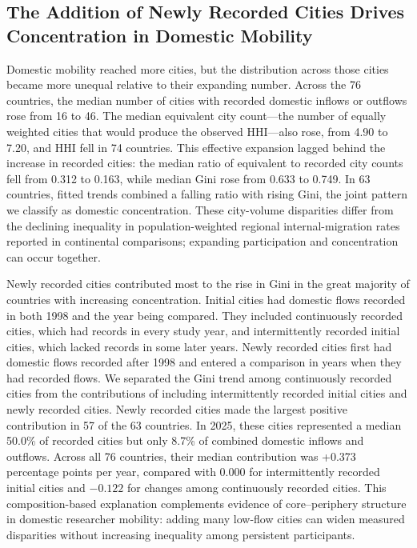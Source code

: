 \FloatBarrier
{}
\subsection{The Addition of Newly Recorded Cities Drives Concentration in Domestic Mobility}

Domestic mobility reached more cities, but the distribution across those cities became more unequal relative to their expanding number. Across the 76 countries, the median number of cities with recorded domestic inflows or outflows rose from 16 to 46. The median equivalent city count---the number of equally weighted cities that would produce the observed HHI---also rose, from 4.90 to 7.20, and HHI fell in 74 countries. This effective expansion lagged behind the increase in recorded cities: the median ratio of equivalent to recorded city counts fell from 0.312 to 0.163, while median Gini rose from 0.633 to 0.749. In 63 countries, fitted trends combined a falling ratio with rising Gini, the joint pattern we classify as domestic concentration. These city-volume disparities differ from the declining inequality in population-weighted regional internal-migration rates reported in continental comparisons\cite{ref029}; expanding participation and concentration can occur together.

Newly recorded cities contributed most to the rise in Gini in the great majority of countries with increasing concentration. Initial cities had domestic flows recorded in both 1998 and the year being compared. They included continuously recorded cities, which had records in every study year, and intermittently recorded initial cities, which lacked records in some later years. Newly recorded cities first had domestic flows recorded after 1998 and entered a comparison in years when they had recorded flows. We separated the Gini trend among continuously recorded cities from the contributions of including intermittently recorded initial cities and newly recorded cities. Newly recorded cities made the largest positive contribution in 57 of the 63 countries. In 2025, these cities represented a median 50.0\% of recorded cities but only 8.7\% of combined domestic inflows and outflows. Across all 76 countries, their median contribution was +0.373 percentage points per year, compared with 0.000 for intermittently recorded initial cities and $-0.122$ for changes among continuously recorded cities. This composition-based explanation complements evidence of core--periphery structure in domestic researcher mobility\cite{ref032}: adding many low-flow cities can widen measured disparities without increasing inequality among persistent participants.

